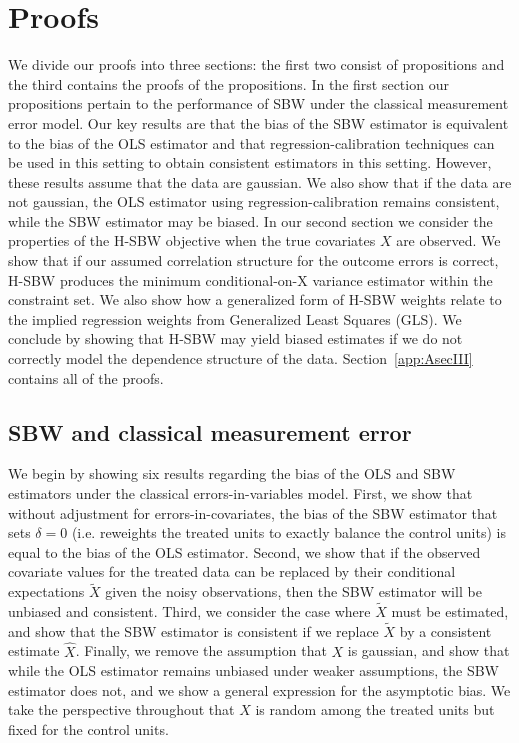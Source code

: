 \section{Proofs}\label{ssec:proof}

We divide our proofs into three sections: the first two consist of propositions and the third contains the proofs of the propositions. In the first section our propositions pertain to the performance of SBW under the classical measurement error model. Our key results are that the bias of the SBW estimator is equivalent to the bias of the OLS estimator and that regression-calibration techniques can be used in this setting to obtain consistent estimators in this setting. However, these results assume that the data are gaussian. We also show that if the data are not gaussian, the OLS estimator using regression-calibration remains consistent, while the SBW estimator may be biased. In our second section we consider the properties of the H-SBW objective when the true covariates $X$ are observed. We show that if our assumed correlation structure for the outcome errors is correct, H-SBW produces the minimum conditional-on-X variance estimator within the constraint set. We also show how a generalized form of H-SBW weights relate to the implied regression weights from Generalized Least Squares (GLS). We conclude by showing that H-SBW may yield biased estimates if we do not correctly model the dependence structure of the data. Section~\ref{app:AsecIII} contains all of the proofs.

\subsection{SBW and classical measurement error}\label{app:AsecI}

We begin by showing six results regarding the bias of the OLS and SBW estimators under the classical errors-in-variables model. First, we show that without adjustment for errors-in-covariates, the bias of the SBW estimator that sets $\delta = 0$ (i.e. reweights the treated units to exactly balance the control units) is equal to the bias of the OLS estimator. Second, we show that if the observed covariate values for the treated data can be replaced by their conditional expectations $\tilde{X}$ given the noisy observations, then the SBW estimator will be unbiased and consistent. Third, we consider the case where $\tilde{X}$ must be estimated, and show that the SBW estimator is consistent if we replace $\tilde{X}$ by a consistent estimate $\hat{X}$. Finally, we remove the assumption that $X$ is gaussian, and show that while the OLS estimator remains unbiased under weaker assumptions, the SBW estimator does not, and we show a general expression for the asymptotic bias. We take the perspective throughout that $X$ is random among the treated units but fixed for the control units.

